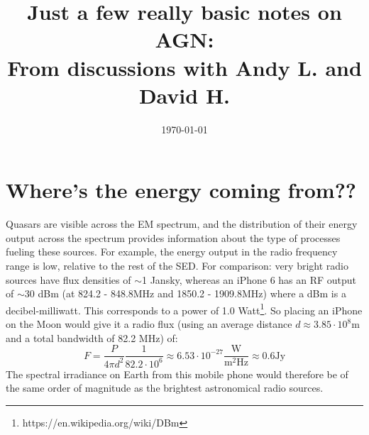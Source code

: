 \documentclass[11pt]{article}
\begin{document}
\title{Just a few really basic notes on AGN: \\
From discussions with Andy L. and David H.}
\date{\today}
\maketitle





\section{Where's the energy coming from??}
\label{sec:energy}
Quasars are visible across the EM spectrum, and the distribution of their energy output across the spectrum provides information about the type of processes fueling these sources. For example, the energy output in the radio frequency range is low, relative to the rest of the SED. For comparison: very bright radio sources have flux densities of $\sim$1 Jansky, whereas an iPhone 6 has an RF output of $\sim$30 dBm (at 824.2 - 848.8MHz and 1850.2 - 1909.8MHz) where a dBm is a decibel-milliwatt. This corresponds to a power of 1.0 Watt\footnote{https://en.wikipedia.org/wiki/DBm}. So placing an iPhone on the Moon would give it a radio flux (using an average distance $d \approx 3.85 \cdot 10^8$m and a total bandwidth of 82.2 MHz)  of:
$$
F = \frac{P}{4\pi d^2}\frac{1}{82.2\cdot 10^6} \approx 6.53 \cdot 10^{-27}\frac{\mathrm{W}}{\mathrm{m}^{2}\mathrm{Hz}} \approx 0.6 \mathrm{Jy}
$$
The spectral irradiance on Earth from this mobile phone would therefore be of the same order of magnitude as the brightest astronomical radio sources.\\
\end{document}
